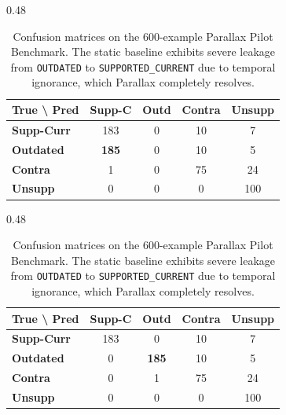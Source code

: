 \begin{table}[h]
\centering
\small
\begin{subtable}[t]{0.48\textwidth}
\centering
\begin{tabular}{l|cccc}
\toprule
\textbf{True \textbackslash{} Pred} & \textbf{Supp-C} & \textbf{Outd} & \textbf{Contra} & \textbf{Unsupp} \\
\midrule
\textbf{Supp-Curr} & 183 & 0 & 10 & 7 \\
\textbf{Outdated}  & \textbf{185} & 0 & 10 & 5 \\
\textbf{Contra}    & 1 & 0 & 75 & 24 \\
\textbf{Unsupp}    & 0 & 0 & 0 & 100 \\
\bottomrule
\end{tabular}
\caption{Static NLI Baseline ($\text{FSR}_{\text{OUTD}} = 92.5\%$)}
\end{subtable}
\hfill
\begin{subtable}[t]{0.48\textwidth}
\centering
\begin{tabular}{l|cccc}
\toprule
\textbf{True \textbackslash{} Pred} & \textbf{Supp-C} & \textbf{Outd} & \textbf{Contra} & \textbf{Unsupp} \\
\midrule
\textbf{Supp-Curr} & 183 & 0 & 10 & 7 \\
\textbf{Outdated}  & 0 & \textbf{185} & 10 & 5 \\
\textbf{Contra}    & 0 & 1 & 75 & 24 \\
\textbf{Unsupp}    & 0 & 0 & 0 & 100 \\
\bottomrule
\end{tabular}
\caption{Parallax Two-Stage Verifier ($\text{FSR}_{\text{OUTD}} = 0.0\%$)}
\end{subtable}
\caption{Confusion matrices on the 600-example Parallax Pilot Benchmark. The static baseline exhibits severe leakage from \texttt{OUTDATED} to \texttt{SUPPORTED\_CURRENT} due to temporal ignorance, which Parallax completely resolves.}
\label{tab:confusion_matrices}
\end{table}
